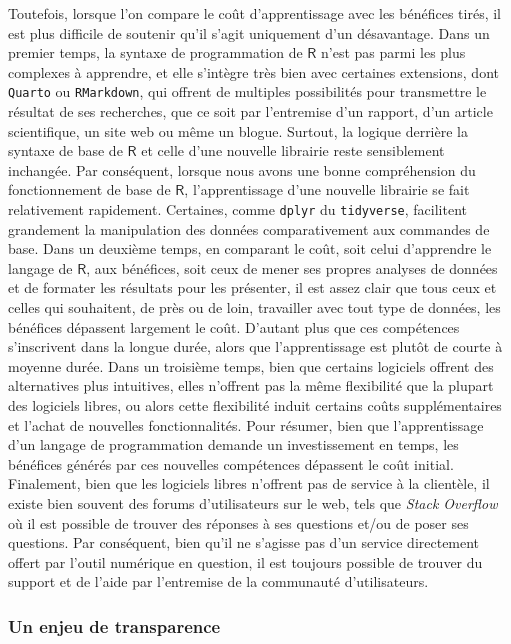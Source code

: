 \documentclass[
  letterpaper,
  DIV=11,
  numbers=noendperiod,
  oneside]{scrreprt}
\begin{document}
Toutefois, lorsque l'on compare le coût d'apprentissage avec les
bénéfices tirés, il est plus difficile de soutenir qu'il s'agit
uniquement d'un désavantage. Dans un premier temps, la syntaxe de
programmation de \(\textsf{R}\) n'est pas parmi les plus complexes à
apprendre, et elle s'intègre très bien avec certaines extensions, dont
\texttt{Quarto} ou \texttt{RMarkdown}, qui offrent de multiples
possibilités pour transmettre le résultat de ses recherches, que ce soit
par l'entremise d'un rapport, d'un article scientifique, un site web ou
même un blogue. Surtout, la logique derrière la syntaxe de base de
\(\textsf{R}\) et celle d'une nouvelle librairie reste sensiblement
inchangée. Par conséquent, lorsque nous avons une bonne compréhension du
fonctionnement de base de \(\textsf{R}\), l'apprentissage d'une nouvelle
librairie se fait relativement rapidement. Certaines, comme
\texttt{dplyr} du \texttt{tidyverse}, facilitent grandement la
manipulation des données comparativement aux commandes de base. Dans un
deuxième temps, en comparant le coût, soit celui d'apprendre le langage
de \(\textsf{R}\), aux bénéfices, soit ceux de mener ses propres
analyses de données et de formater les résultats pour les présenter, il
est assez clair que tous ceux et celles qui souhaitent, de près ou de
loin, travailler avec tout type de données, les bénéfices dépassent
largement le coût. D'autant plus que ces compétences s'inscrivent dans
la longue durée, alors que l'apprentissage est plutôt de courte à
moyenne durée. Dans un troisième temps, bien que certains logiciels
offrent des alternatives plus intuitives, elles n'offrent pas la même
flexibilité que la plupart des logiciels libres, ou alors cette
flexibilité induit certains coûts supplémentaires et l'achat de
nouvelles fonctionnalités. Pour résumer, bien que l'apprentissage d'un
langage de programmation demande un investissement en temps, les
bénéfices générés par ces nouvelles compétences dépassent le coût
initial. Finalement, bien que les logiciels libres n'offrent pas de
service à la clientèle, il existe bien souvent des forums d'utilisateurs
sur le web, tels que \emph{Stack Overflow} où il est possible de trouver
des réponses à ses questions et/ou de poser ses questions. Par
conséquent, bien qu'il ne s'agisse pas d'un service directement offert
par l'outil numérique en question, il est toujours possible de trouver
du support et de l'aide par l'entremise de la communauté d'utilisateurs.

\hypertarget{un-enjeu-de-transparence}{%
\subsubsection{Un enjeu de
transparence}\label{un-enjeu-de-transparence}}
\end{document}

